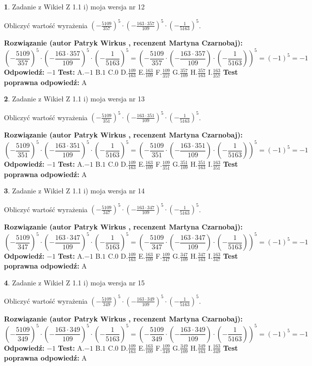 \documentclass[12pt, a4paper]{article}
\theoremstyle{definition} %
\newtheorem{zad}{}
\newcommand{\zadStart}[1]{\begin{zad}#1\newline}
\newcommand{\zadStop}{\end{zad}}
\newcommand{\rozwStart}[2]{\noindent \textbf{Rozwiązanie (autor #1 , recenzent #2): }\newline}
\newcommand{\rozwStop}{\newline}
\newcommand{\odpStart}{\noindent \textbf{Odpowiedź:}\newline}
\newcommand{\odpStop}{\newline}
\newcommand{\testStart}{\noindent \textbf{Test:}\newline}
\newcommand{\testStop}{\newline}
\newcommand{\kluczStart}{\noindent \textbf{Test poprawna odpowiedź:}\newline}
\newcommand{\kluczStop}{\newline}
\begin{document}
\zadStart{Zadanie z Wikieł Z 1.1 i) moja wersja nr 12}

Obliczyć wartość wyrażenia $(-\frac{5109}{357})^{5} \cdot (-\frac{163 \cdot 357}{109})^{5} \cdot (-\frac{1}{5163})^{5}$.
\zadStop
\rozwStart{Patryk Wirkus}{Martyna Czarnobaj}
$$(-\frac{5109}{357})^{5} \cdot (-\frac{163 \cdot 357}{109})^{5} \cdot (-\frac{1}{5163})^{5} = (-\frac{5109}{357} \cdot (-\frac{163 \cdot 357}{109}) \cdot (-\frac{1}{5163}))^{5} = (-1)^{5} = -1$$
\rozwStop
\odpStart
$-1$
\odpStop
\testStart
A.$-1$ B.$1$ C.$0$ D.$\frac{109}{163}$ E.$\frac{163}{109}$
F.$\frac{109}{357}$ G.$\frac{357}{109}$
H.$\frac{357}{163}$
I.$\frac{163}{357}$
\testStop
\kluczStart
A
\kluczStop



\zadStart{Zadanie z Wikieł Z 1.1 i) moja wersja nr 13}

Obliczyć wartość wyrażenia $(-\frac{5109}{351})^{5} \cdot (-\frac{163 \cdot 351}{109})^{5} \cdot (-\frac{1}{5163})^{5}$.
\zadStop
\rozwStart{Patryk Wirkus}{Martyna Czarnobaj}
$$(-\frac{5109}{351})^{5} \cdot (-\frac{163 \cdot 351}{109})^{5} \cdot (-\frac{1}{5163})^{5} = (-\frac{5109}{351} \cdot (-\frac{163 \cdot 351}{109}) \cdot (-\frac{1}{5163}))^{5} = (-1)^{5} = -1$$
\rozwStop
\odpStart
$-1$
\odpStop
\testStart
A.$-1$ B.$1$ C.$0$ D.$\frac{109}{163}$ E.$\frac{163}{109}$
F.$\frac{109}{351}$ G.$\frac{351}{109}$
H.$\frac{351}{163}$
I.$\frac{163}{351}$
\testStop
\kluczStart
A
\kluczStop



\zadStart{Zadanie z Wikieł Z 1.1 i) moja wersja nr 14}

Obliczyć wartość wyrażenia $(-\frac{5109}{347})^{5} \cdot (-\frac{163 \cdot 347}{109})^{5} \cdot (-\frac{1}{5163})^{5}$.
\zadStop
\rozwStart{Patryk Wirkus}{Martyna Czarnobaj}
$$(-\frac{5109}{347})^{5} \cdot (-\frac{163 \cdot 347}{109})^{5} \cdot (-\frac{1}{5163})^{5} = (-\frac{5109}{347} \cdot (-\frac{163 \cdot 347}{109}) \cdot (-\frac{1}{5163}))^{5} = (-1)^{5} = -1$$
\rozwStop
\odpStart
$-1$
\odpStop
\testStart
A.$-1$ B.$1$ C.$0$ D.$\frac{109}{163}$ E.$\frac{163}{109}$
F.$\frac{109}{347}$ G.$\frac{347}{109}$
H.$\frac{347}{163}$
I.$\frac{163}{347}$
\testStop
\kluczStart
A
\kluczStop



\zadStart{Zadanie z Wikieł Z 1.1 i) moja wersja nr 15}

Obliczyć wartość wyrażenia $(-\frac{5109}{349})^{5} \cdot (-\frac{163 \cdot 349}{109})^{5} \cdot (-\frac{1}{5163})^{5}$.
\zadStop
\rozwStart{Patryk Wirkus}{Martyna Czarnobaj}
$$(-\frac{5109}{349})^{5} \cdot (-\frac{163 \cdot 349}{109})^{5} \cdot (-\frac{1}{5163})^{5} = (-\frac{5109}{349} \cdot (-\frac{163 \cdot 349}{109}) \cdot (-\frac{1}{5163}))^{5} = (-1)^{5} = -1$$
\rozwStop
\odpStart
$-1$
\odpStop
\testStart
A.$-1$ B.$1$ C.$0$ D.$\frac{109}{163}$ E.$\frac{163}{109}$
F.$\frac{109}{349}$ G.$\frac{349}{109}$
H.$\frac{349}{163}$
I.$\frac{163}{349}$
\testStop
\kluczStart
A
\kluczStop
\end{document}
